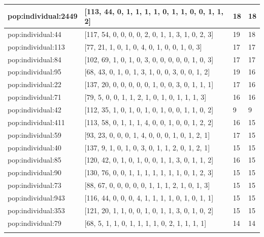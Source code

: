 \begin{table}
\begin{tabular}{p{3cm} p{4cm} p{3cm} p{3cm}}
\small{pop:individual:2449} & \small{[113, 44, 0, 1, 1, 1, 1, 0, 1, 1, 0, 0, 1, 1, 2]}
& \small{18} & \small{18}\\ \hline
\small{pop:individual:44} & \small{[117, 54, 0, 0, 0, 0, 2, 0, 1, 1, 3, 1, 0, 2, 3]}
& \small{19} & \small{18}\\ \hline
\small{pop:individual:113} & \small{[77, 21, 1, 0, 1, 0, 4, 0, 1, 0, 0, 1, 0, 3]}
& \small{17} & \small{17}\\ \hline
\small{pop:individual:84} & \small{[102, 69, 1, 0, 1, 0, 3, 0, 0, 0, 0, 0, 1, 0, 3]}
& \small{17} & \small{17}\\ \hline
\small{pop:individual:95} & \small{[68, 43, 0, 1, 0, 1, 3, 1, 0, 0, 3, 0, 0, 1, 2]}
& \small{19} & \small{16}\\ \hline
\small{pop:individual:22} & \small{[137, 20, 0, 0, 0, 0, 0, 1, 0, 0, 3, 0, 1, 1, 1]}
& \small{17} & \small{16}\\ \hline
\small{pop:individual:71} & \small{[79, 5, 0, 0, 1, 1, 2, 1, 0, 1, 0, 1, 1, 1, 3]}
& \small{16} & \small{16}\\ \hline
\small{pop:individual:42} & \small{[112, 35, 1, 0, 1, 0, 1, 0, 1, 0, 0, 1, 1, 0, 2]}
& \small{9} & \small{9}\\ \hline
\small{pop:individual:411} & \small{[113, 58, 0, 1, 1, 1, 4, 0, 0, 1, 0, 0, 1, 2, 2]}
& \small{16} & \small{15}\\ \hline
\small{pop:individual:59} & \small{[93, 23, 0, 0, 0, 1, 4, 0, 0, 0, 1, 0, 1, 2, 1]}
& \small{17} & \small{15}\\ \hline
\small{pop:individual:40} & \small{[137, 9, 1, 0, 1, 0, 3, 0, 1, 1, 2, 0, 1, 2, 1]}
& \small{15} & \small{15}\\ \hline
\small{pop:individual:85} & \small{[120, 42, 0, 1, 0, 1, 0, 0, 1, 1, 3, 0, 1, 1, 2]}
& \small{16} & \small{15}\\ \hline
\small{pop:individual:90} & \small{[130, 76, 0, 0, 1, 1, 1, 1, 1, 1, 1, 0, 1, 2, 3]}
& \small{15} & \small{15}\\ \hline
\small{pop:individual:73} & \small{[88, 67, 0, 0, 0, 0, 0, 1, 1, 1, 2, 1, 0, 1, 3]}
& \small{15} & \small{15}\\ \hline
\small{pop:individual:943} & \small{[116, 44, 0, 0, 0, 4, 1, 1, 1, 1, 0, 1, 0, 1, 1]}
& \small{15} & \small{15}\\ \hline
\small{pop:individual:353} & \small{[121, 20, 1, 1, 0, 0, 1, 0, 1, 1, 3, 0, 1, 0, 2]}
& \small{15} & \small{15}\\ \hline
\small{pop:individual:79} & \small{[68, 5, 1, 1, 0, 1, 1, 1, 1, 0, 2, 1, 1, 1, 1]}
& \small{14} & \small{14}\\ \hline
\noalign{\smallskip}\hline
\end{tabular}
\end{table}

